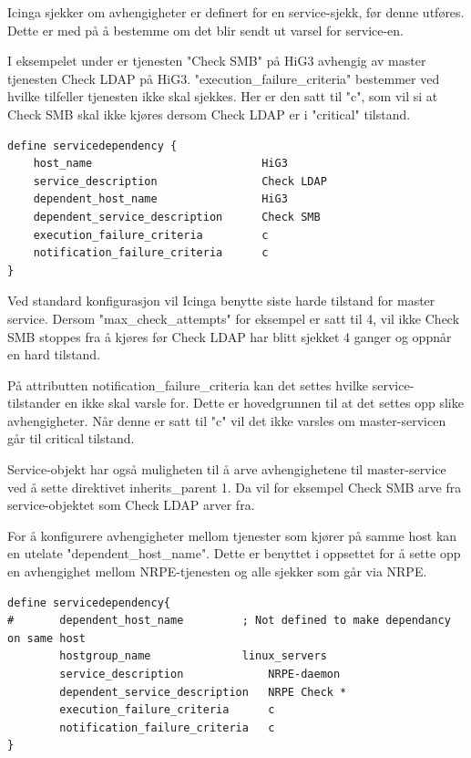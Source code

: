Icinga sjekker om avhengigheter er definert for en service-sjekk, før denne utføres. Dette er med på å bestemme om det blir sendt ut varsel for service-en.

I eksempelet under er tjenesten "Check SMB" på HiG3 avhengig av master tjenesten Check LDAP på HiG3. "execution\_failure\_criteria" bestemmer ved hvilke tilfeller tjenesten ikke skal sjekkes. Her er den satt til "c", som vil si at Check SMB skal ikke kjøres dersom Check LDAP er i "critical" tilstand.

\begin{lstlisting}
define servicedependency {
	host_name                          HiG3
	service_description                Check LDAP
	dependent_host_name                HiG3
	dependent_service_description      Check SMB
	execution_failure_criteria         c
	notification_failure_criteria      c
}
\end{lstlisting}

Ved standard konfigurasjon vil Icinga benytte siste harde tilstand for master service. Dersom "max\_check\_attempts" for eksempel er satt til 4, vil ikke Check SMB stoppes fra å kjøres før Check LDAP har blitt sjekket 4 ganger og oppnår en hard tilstand. 

På attributten notification\_failure\_criteria kan det settes hvilke service-tilstander en ikke skal varsle for. Dette er hovedgrunnen til at det settes opp slike avhengigheter. Når denne er satt til "c" vil det ikke varsles om master-servicen går til critical tilstand.

Service-objekt har også muligheten til å arve avhengighetene til master-service ved å sette direktivet inherits\_parent 1. Da vil for eksempel Check SMB arve fra service-objektet som Check LDAP arver fra.

For å konfigurere avhengigheter mellom tjenester som kjører på samme host kan en utelate "dependent\_host\_name". Dette er benyttet i oppsettet for å sette opp en avhengighet mellom NRPE-tjenesten og alle sjekker som går via NRPE.

\begin{lstlisting}
define servicedependency{
#       dependent_host_name   		; Not defined to make dependancy on same host            
        hostgroup_name           	linux_servers
        service_description         	NRPE-daemon
        dependent_service_description   NRPE Check *
        execution_failure_criteria      c
        notification_failure_criteria   c
}
\end{lstlisting}

